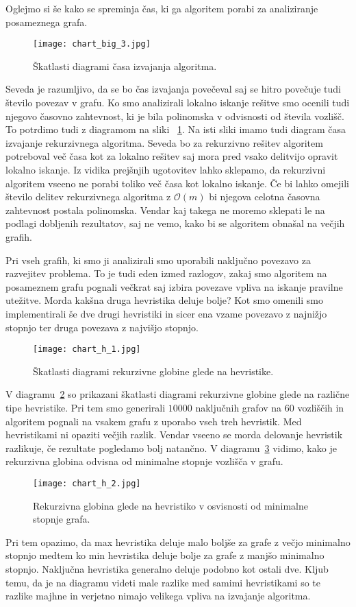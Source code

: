 \documentclass[12pt,a4paper,twoside]{article}
\theoremstyle{definition} %
\theoremstyle{plain} %
\numberwithin{equation}{section}  %
\begin{document}
Oglejmo si še kako se spreminja čas, ki ga algoritem porabi za analiziranje posameznega grafa.
 \begin{figure}[h!]
\caption{Škatlasti diagrami časa izvajanja algoritma.}
\label{chart_big_3}
\centering
    \texttt{[image: chart\_big\_3.jpg]}
    \end{figure}
Seveda je razumljivo, da se bo čas izvajanja povečeval saj se hitro povečuje tudi število povezav v grafu. Ko smo analizirali lokalno iskanje rešitve smo ocenili tudi njegovo časovno zahtevnost, ki je bila polinomska v odvisnosti od števila vozlišč. To potrdimo tudi z diagramom na sliki ~\ref{chart_big_3}. Na isti sliki imamo tudi diagram časa izvajanje rekurzivnega algoritma. Seveda bo za rekurzivno rešitev algoritem potreboval več časa kot za lokalno rešitev saj mora pred vsako delitvijo opravit lokalno iskanje. Iz vidika prejšnjih ugotovitev lahko sklepamo, da rekurzivni algoritem vseeno ne porabi toliko več časa kot lokalno iskanje. Če bi lahko omejili število delitev rekurzivnega algoritma z $\mathcal{O}(m)$ bi njegova celotna časovna zahtevnost postala polinomska. Vendar kaj takega ne moremo sklepati le na podlagi dobljenih rezultatov, saj ne vemo, kako bi se algoritem obnašal na večjih grafih.

Pri vseh grafih, ki smo ji analizirali smo uporabili naključno povezavo za razvejitev problema. To je tudi eden izmed razlogov, zakaj smo algoritem na posameznem grafu pognali večkrat saj izbira povezave vpliva na iskanje pravilne utežitve. Morda kakšna druga hevristika deluje bolje? Kot smo omenili smo implementirali še dve drugi hevristiki in sicer ena vzame povezavo z najnižjo stopnjo ter druga povezava z najvišjo stopnjo. 
 \begin{figure}[h!]
\caption{Škatlasti diagrami rekurzivne globine glede na hevristike.}
\label{chart_h_1}
\centering
    \texttt{[image: chart\_h\_1.jpg]}
    \end{figure}
V diagramu~\ref{chart_h_1} so prikazani škatlasti diagrami rekurzivne globine glede na različne tipe hevristike. Pri tem smo generirali $10000$ naključnih grafov na $60$ vozliščih in algoritem pognali na vsakem grafu z uporabo vseh treh hevristik. Med hevristikami ni opaziti večjih razlik. Vendar vseeno se morda delovanje hevristik razlikuje, če rezultate pogledamo bolj natančno. V diagramu~\ref{chart_h_2} vidimo, kako je rekurzivna globina odvisna od minimalne stopnje vozlišča v grafu.
 \begin{figure}[h!]
\caption{Rekurzivna globina glede na hevristiko v osvisnosti od minimalne stopnje grafa.}
\label{chart_h_2}
\centering
    \texttt{[image: chart\_h\_2.jpg]}
    \end{figure}
Pri tem opazimo, da max hevristika deluje malo boljše za grafe z večjo minimalno stopnjo medtem ko min hevristika deluje bolje za grafe z manjšo  minimalno stopnjo. Naključna hevristika generalno deluje podobno kot ostali dve. Kljub temu, da je na diagramu videti male razlike med samimi hevristikami so te razlike majhne in verjetno nimajo velikega vpliva na izvajanje algoritma.
\end{document}
